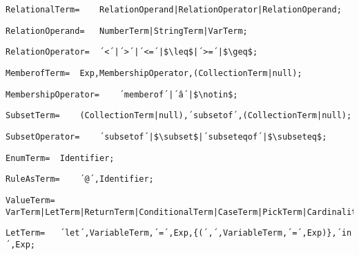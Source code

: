 \documentclass{article}
\begin{document}
    \begin{lstlisting}[mathescape=true]
     RelationalTerm= 	RelationOperand|RelationOperator|RelationOperand;
    \end{lstlisting}
    
    \begin{lstlisting}[mathescape=true]
     RelationOperand= 	NumberTerm|StringTerm|VarTerm;
    \end{lstlisting}
    
    \begin{lstlisting}[mathescape=true]
     RelationOperator= 	´<´|´>´|´<=´|$\leq$|´>=´|$\geq$;
    \end{lstlisting}
    
    \begin{lstlisting}[mathescape=true]
     MemberofTerm= 	Exp,MembershipOperator,(CollectionTerm|null);
    \end{lstlisting}
    
    \begin{lstlisting}[mathescape=true]
     MembershipOperator= 	´memberof´|´â´|$\notin$;
    \end{lstlisting}
    
    \begin{lstlisting}[mathescape=true]
     SubsetTerm= 	(CollectionTerm|null),´subsetof´,(CollectionTerm|null);
    \end{lstlisting}
    
    \begin{lstlisting}[mathescape=true]
     SubsetOperator= 	´subsetof´|$\subset$|´subseteqof´|$\subseteq$;
    \end{lstlisting}
    
    \begin{lstlisting}[mathescape=true]
     EnumTerm= 	Identifier;
    \end{lstlisting}
    
    \begin{lstlisting}[mathescape=true]
     RuleAsTerm= 	´@´,Identifier;
    \end{lstlisting}
    
    \begin{lstlisting}[mathescape=true]
     ValueTerm= 	VarTerm|LetTerm|ReturnTerm|ConditionalTerm|CaseTerm|PickTerm|CardinalityTerm;
    \end{lstlisting}
    
    \begin{lstlisting}[mathescape=true]
     LetTerm= 	´let´,VariableTerm,´=´,Exp,{(´,´,VariableTerm,´=´,Exp)},´in´,Exp;
    \end{lstlisting}
    
\end{document}
